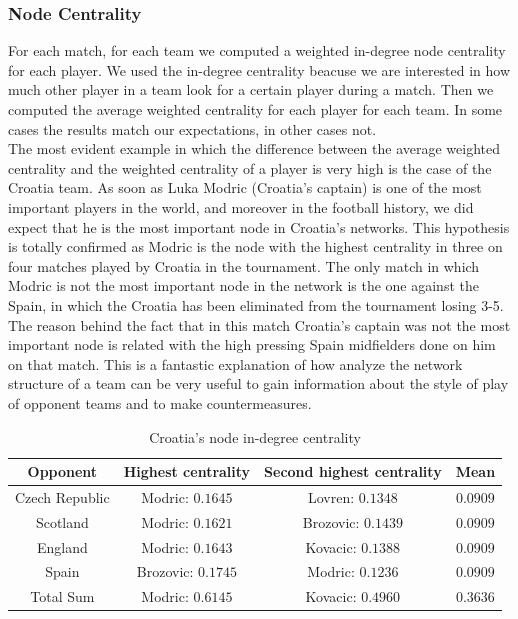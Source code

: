 \documentclass[12pt, a4paper]{article}
\begin{document}
\subsubsection{Node Centrality}
For each match, for each team we computed a weighted in-degree node centrality for each player. We used the in-degree centrality beacuse we are interested in how much other player in a team look for a certain player during a match. Then we computed the average weighted centrality for each player for each team. In some cases the results match our expectations, in other cases not. \\
The most evident example in which the difference between the average weighted centrality and the weighted centrality of a player is very high is the case of the Croatia team. As soon as Luka Modric (Croatia's captain) is one of the most important players in the world, and moreover in the football history, we did expect that he is the most important node in Croatia's networks. This hypothesis is totally confirmed as Modric is the node with the highest centrality in three on four matches played by Croatia in the tournament. The only match in which Modric is not the most important node in the network is the one against the Spain, in which the Croatia has been eliminated from the tournament losing 3-5. The reason behind the fact that in this match Croatia's captain was not the most important node is related with the high pressing Spain midfielders done on him on that match. This is a fantastic explanation of how analyze the network structure of a team can be very useful to gain information about the style of play of opponent teams and to make countermeasures.  \\ 

\begin{table}[H]
    \centering
    \begin{tabular}{|c|c|c|c|}
            \hline
           Opponent & Highest centrality & Second highest centrality & Mean \\
            \hline
            Czech Republic &  Modric: $0.1645$ & Lovren: $0.1348$ & $0.0909$ \\
            \hline
            Scotland &  Modric: $0.1621$ & Brozovic: $0.1439$ & $0.0909$ \\
            \hline
            England &  Modric: $0.1643$ & Kovacic: $0.1388$ & $0.0909$ \\
            \hline
            Spain &  Brozovic: $0.1745$ & Modric: $0.1236$ & $0.0909$ \\
            \hline
            Total Sum &  Modric: $0.6145$ & Kovacic: $0.4960$ & $0.3636$ \\
            \hline
    \end{tabular}
    \caption{Croatia's node in-degree centrality}
\end{table}
\end{document}
